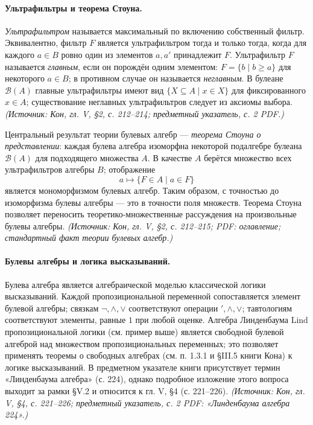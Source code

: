 \documentclass[a4paper,12pt]{article}
\begin{document}
\paragraph{Ультрафильтры и теорема Стоуна.}
\emph{Ультрафильтром} называется максимальный по включению собственный фильтр. Эквивалентно, фильтр \(F\) является ультрафильтром тогда и только тогда, когда для каждого \(a\in B\) ровно один из элементов \(a,a'\) принадлежит \(F\). Ультрафильтр \(F\) называется \emph{главным}, если он порождён одним элементом: \(F=\{b\mid b\ge a\}\) для некоторого \(a\in B\); в противном случае он называется \emph{неглавным}. В булеане \(\mathcal{B}(A)\) главные ультрафильтры имеют вид \(\{X\subseteq A\mid x\in X\}\) для фиксированного \(x\in A\); существование неглавных ультрафильтров следует из аксиомы выбора.
\textit{(Источник: Кон, гл. V, §2, с. 212--214; предметный указатель, с. 2 PDF.)}

Центральный результат теории булевых алгебр — \emph{теорема Стоуна о представлении}: каждая булева алгебра изоморфна некоторой подалгебре булеана \(\mathcal{B}(A)\) для подходящего множества \(A\). В качестве \(A\) берётся множество всех ультрафильтров алгебры \(B\); отображение
\[
a\mapsto\{F\in A\mid a\in F\}
\]
является мономорфизмом булевых алгебр. Таким образом, с точностью до изоморфизма булевы алгебры — это в точности поля множеств. Теорема Стоуна позволяет переносить теоретико-множественные рассуждения на произвольные булевы алгебры.
\textit{(Источник: Кон, гл. V, §2, с. 212--215; PDF: оглавление; стандартный факт теории булевых алгебр.)}

\paragraph{Булевы алгебры и логика высказываний.}
Булева алгебра является алгебраической моделью классической логики высказываний. Каждой пропозициональной переменной сопоставляется элемент булевой алгебры; связкам \(\neg,\wedge,\vee\) соответствуют операции \(',\wedge,\vee\); тавтологиям соответствуют элементы, равные \(1\) при любой оценке. Алгебра Линденбаума \(\mathrm{Lind}\) пропозициональной логики (см. пример выше) является свободной булевой алгеброй над множеством пропозициональных переменных; это позволяет применять теоремы о свободных алгебрах (см. п. 1.3.1 и §III.5 книги Кона) к логике высказываний. В предметном указателе книги присутствует термин «Линденбаума алгебра» (с. 224), однако подробное изложение этого вопроса выходит за рамки §V.2 и относится к гл. V, §4 (с. 221--226).
\textit{(Источник: Кон, гл. V, §4, с. 221--226; предметный указатель, с. 2 PDF: «Линденбаума алгебра 224».)}
\end{document}
